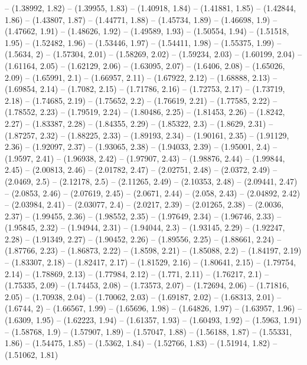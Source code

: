 -- (1.38992, 1.82)
-- (1.39955, 1.83)
-- (1.40918, 1.84)
-- (1.41881, 1.85)
-- (1.42844, 1.86)
-- (1.43807, 1.87)
-- (1.44771, 1.88)
-- (1.45734, 1.89)
-- (1.46698, 1.9)
-- (1.47662, 1.91)
-- (1.48626, 1.92)
-- (1.49589, 1.93)
-- (1.50554, 1.94)
-- (1.51518, 1.95)
-- (1.52482, 1.96)
-- (1.53446, 1.97)
-- (1.54411, 1.98)
-- (1.55375, 1.99)
-- (1.5634, 2)
-- (1.57304, 2.01)
-- (1.58269, 2.02)
-- (1.59234, 2.03)
-- (1.60199, 2.04)
-- (1.61164, 2.05)
-- (1.62129, 2.06)
-- (1.63095, 2.07)
-- (1.6406, 2.08)
-- (1.65026, 2.09)
-- (1.65991, 2.1)
-- (1.66957, 2.11)
-- (1.67922, 2.12)
-- (1.68888, 2.13)
-- (1.69854, 2.14)
-- (1.7082, 2.15)
-- (1.71786, 2.16)
-- (1.72753, 2.17)
-- (1.73719, 2.18)
-- (1.74685, 2.19)
-- (1.75652, 2.2)
-- (1.76619, 2.21)
-- (1.77585, 2.22)
-- (1.78552, 2.23)
-- (1.79519, 2.24)
-- (1.80486, 2.25)
-- (1.81453, 2.26)
-- (1.8242, 2.27)
-- (1.83387, 2.28)
-- (1.84355, 2.29)
-- (1.85322, 2.3)
-- (1.8629, 2.31)
-- (1.87257, 2.32)
-- (1.88225, 2.33)
-- (1.89193, 2.34)
-- (1.90161, 2.35)
-- (1.91129, 2.36)
-- (1.92097, 2.37)
-- (1.93065, 2.38)
-- (1.94033, 2.39)
-- (1.95001, 2.4)
-- (1.9597, 2.41)
-- (1.96938, 2.42)
-- (1.97907, 2.43)
-- (1.98876, 2.44)
-- (1.99844, 2.45)
-- (2.00813, 2.46)
-- (2.01782, 2.47)
-- (2.02751, 2.48)
-- (2.0372, 2.49)
-- (2.0469, 2.5)
-- (2.12178, 2.5)
-- (2.11265, 2.49)
-- (2.10353, 2.48)
-- (2.09441, 2.47)
-- (2.0853, 2.46)
-- (2.07619, 2.45)
-- (2.0671, 2.44)
-- (2.058, 2.43)
-- (2.04892, 2.42)
-- (2.03984, 2.41)
-- (2.03077, 2.4)
-- (2.0217, 2.39)
-- (2.01265, 2.38)
-- (2.0036, 2.37)
-- (1.99455, 2.36)
-- (1.98552, 2.35)
-- (1.97649, 2.34)
-- (1.96746, 2.33)
-- (1.95845, 2.32)
-- (1.94944, 2.31)
-- (1.94044, 2.3)
-- (1.93145, 2.29)
-- (1.92247, 2.28)
-- (1.91349, 2.27)
-- (1.90452, 2.26)
-- (1.89556, 2.25)
-- (1.88661, 2.24)
-- (1.87766, 2.23)
-- (1.86873, 2.22)
-- (1.8598, 2.21)
-- (1.85088, 2.2)
-- (1.84197, 2.19)
-- (1.83307, 2.18)
-- (1.82417, 2.17)
-- (1.81529, 2.16)
-- (1.80641, 2.15)
-- (1.79754, 2.14)
-- (1.78869, 2.13)
-- (1.77984, 2.12)
-- (1.771, 2.11)
-- (1.76217, 2.1)
-- (1.75335, 2.09)
-- (1.74453, 2.08)
-- (1.73573, 2.07)
-- (1.72694, 2.06)
-- (1.71816, 2.05)
-- (1.70938, 2.04)
-- (1.70062, 2.03)
-- (1.69187, 2.02)
-- (1.68313, 2.01)
-- (1.6744, 2)
-- (1.66567, 1.99)
-- (1.65696, 1.98)
-- (1.64826, 1.97)
-- (1.63957, 1.96)
-- (1.6309, 1.95)
-- (1.62223, 1.94)
-- (1.61357, 1.93)
-- (1.60493, 1.92)
-- (1.5963, 1.91)
-- (1.58768, 1.9)
-- (1.57907, 1.89)
-- (1.57047, 1.88)
-- (1.56188, 1.87)
-- (1.55331, 1.86)
-- (1.54475, 1.85)
-- (1.5362, 1.84)
-- (1.52766, 1.83)
-- (1.51914, 1.82)
-- (1.51062, 1.81)
